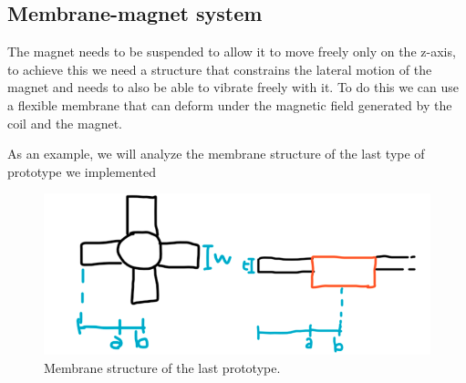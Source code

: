 \subsection{Membrane-magnet system}
The magnet needs to be suspended to allow it to move freely only on the z-axis, to achieve this we need a structure that constrains the lateral motion of the magnet and needs to also be able to vibrate freely with it.
To do this we can use a flexible membrane that can deform under the magnetic field generated by the coil and the magnet. 

As an example, we will analyze the membrane structure of the last type of prototype we implemented %
\begin{figure}
    \centering
    \includegraphics[scale=0.4]{Chapters/Chapter2/Modelling_of_Entire_System/Figures/membrane.png} %
    \caption[Membrane structure]{Membrane structure of the last prototype.}
    \label{fig:Membrane_structure}
\end{figure}

